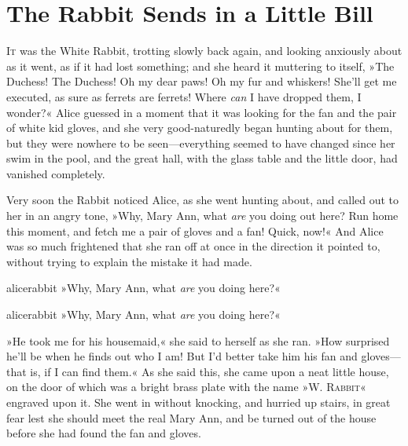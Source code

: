 \chapter{The Rabbit Sends in a Little Bill}

\lettrine[lines=4,findent=2pt]{I}{t} was the White Rabbit, trotting slowly back again, and looking anxiously about as it went, as if it had lost something; and she heard it muttering to itself, »The Duchess! The Duchess! Oh my dear paws! Oh my fur and whiskers! She'll get me executed, as sure as ferrets are ferrets! Where \textit{can} I have dropped them, I wonder?« Alice guessed in a moment that it was looking for the fan and the pair of white kid gloves, and she very good-naturedly began hunting about for them, but they were nowhere to be seen—everything seemed to have changed since her swim in the pool, and the great hall, with the glass table and the little door, had vanished completely.

Very soon the Rabbit noticed Alice, as she went hunting about, and called out to her in an angry tone, »Why, Mary Ann, what \textit{are} you doing out here? Run home this moment, and fetch me a pair of gloves and a fan! Quick, now!« And Alice was so much frightened that she ran off at once in the direction it pointed to, without trying to explain the mistake it had made.


\begin{pictures}
	\begin{letter}
		\begin{colorbigpic}
			[1.1]
			{alicerabbit}
			{»Why, Mary Ann, what \textit{are} you doing here?«}
			\end{colorbigpic}
	\end{letter}
	
	\begin{a4}
		\begin{colorbigpic}
			[1.0]
			{alicerabbit}
			{»Why, Mary Ann, what \textit{are} you doing here?«}
		\end{colorbigpic}
	\end{a4}	
\end{pictures}


»He took me for his housemaid,« she said to herself as she ran. »How surprised he'll be when he finds out who I am! But I'd better take him his fan and gloves—that is, if I can find them.« As she said this, she came upon a neat little house, on the door of which was a bright brass plate with the name »\textsc{W. Rabbit}« engraved upon it. She went in without knocking, and hurried up stairs, in great fear lest she should meet the real Mary Ann, and be turned out of the house before she had found the fan and gloves.

